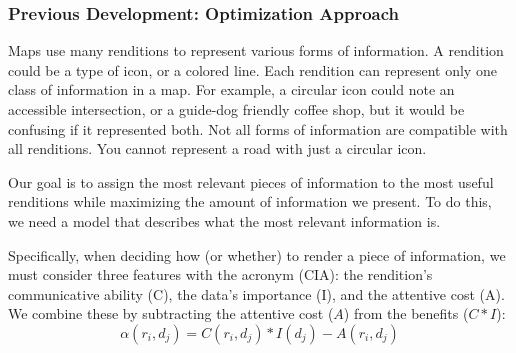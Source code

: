 \subsubsection{Previous Development: Optimization Approach}
Maps use many renditions to represent various forms of information. A  rendition could be a type of icon, or a colored line. Each rendition can represent only one class of information in a map. For example, a circular icon could note an accessible intersection, or a guide-dog friendly coffee shop, but it would be confusing if it represented both. Not all forms of information are compatible with all renditions. You cannot represent a road with just a circular icon. 

Our goal is to assign the most relevant pieces of information to the most useful renditions while maximizing the amount of information we present.  To do this, we need a model that describes what the most relevant information is.



Specifically, when deciding how (or whether) to render a piece of information, we must consider three features with the acronym (CIA): the rendition's communicative ability (C), the data's importance (I), and the attentive cost (A).
We combine these by subtracting the attentive cost ($A$)  from the benefits ($C*I$): 
\begin{equation}
\label{eq::CIA}
\alpha(r_i, d_j) = C(r_i, d_j)*I(d_j)-A(r_i, d_j)
\end{equation}

